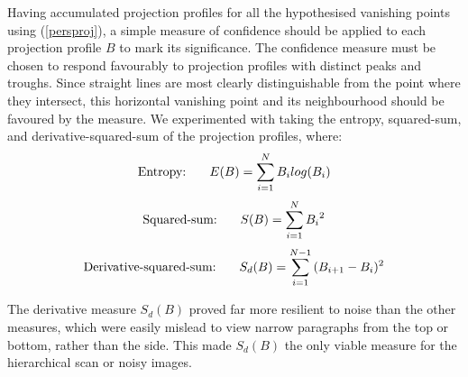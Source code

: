 
Having accumulated projection profiles for all the hypothesised vanishing points
using (\ref{persproj}), a simple measure of confidence should be
applied to each projection profile $B$ to mark its significance.
The confidence measure must be chosen to respond favourably to projection profiles
with distinct peaks and troughs.
Since straight lines are most clearly distinguishable from the point where they
intersect, this horizontal vanishing point and its neighbourhood should be
favoured by the measure. We experimented with taking the entropy, squared-sum, and
derivative-squared-sum of the projection profiles, where:
\begin{equation} \mbox{Entropy: } \hspace*{5mm} E(B) = \sum_{i=1}^{N}{B_{i} log(B_{i})} \end{equation}
\begin{equation} \mbox{Squared-sum: } \hspace*{5mm} S(B) = \sum_{i=1}^{N}{{B_{i}}^{2}} \end{equation}
\begin{equation} \mbox{Derivative-squared-sum: } \hspace*{5mm} S_d(B) = \sum_{i=1}^{N-1}{{(B_{i+1}-B_{i}})^{2}} \end{equation}

The derivative measure $S_d(B)$ proved far more resilient to noise than the
other measures, which were easily mislead to view narrow paragraphs from the
top or bottom, rather than the side.
This made $S_d(B)$ the only viable measure for the hierarchical scan or noisy
images.

